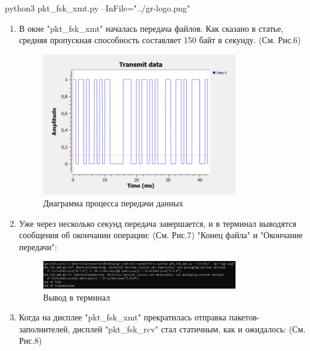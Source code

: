 \documentclass[12pt]{article}
\begin{document}
 python3 pkt\_fsk\_xmt.py --InFile="../gr-logo.png"
 
\begin{enumerate}

	\item В окне "pkt\_fsk\_xmt" началась передача файлов. Как сказано в статье, средняя пропускная способность составляет 150 байт в секунду. (См. Рис.6)
	
\begin{figure}[H]
    \centering
    	\includegraphics[width=0.8\textwidth]{pics/a0000-img006.png}
    	\caption{Диаграмма процесса передачи данных}
\end{figure}

	\item Уже через несколько секунд передача завершается, и в терминал выводятся сообщения об окончании операции: (См. Рис.7) "Конец файла" и "Окончание передачи":
	
\begin{figure}[H]
    \centering
    \includegraphics[width=0.8\textwidth]{pics/a0000-img007.png}
    \caption{Вывод в терминал}
\end{figure}

	\item Когда на дисплее "pkt\_fsk\_xmt" прекратилась отправка пакетов-заполнителей, дисплей "pkt\_fsk\_rcv" стал статичным, как и ожидалось: (См. Рис.8)
	

\end{enumerate}
\end{document}
